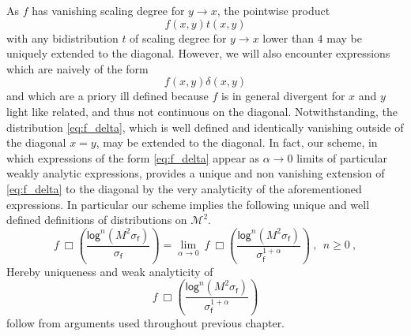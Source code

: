 \documentclass[11pt]{book}
\renewcommand{\log}{\mathsf{log}}
\newcommand{\Mcal}{\mathcal{M}}
\newcommand{\fsf}{\mathsf{f}}
\theoremstyle{break}
\begin{document}
As $f$ has vanishing scaling degree for $y \to x$, the pointwise product 
%
\begin{equation*}
f(x,y) t(x,y) 
\end{equation*}
%
with any bidistribution $t$ of scaling degree for $y\to x$ lower than $4$ may be uniquely extended to the diagonal. However, we will also encounter expressions which are naively of the form 
%
\begin{equation}
f(x,y) \delta(x,y) 
\label{eq:f_delta}
\end{equation}
%
and which are a priory ill defined because $f$ is in general divergent for $x$ and $y$ light like related, and thus not continuous on the diagonal. Notwithstanding, the distribution \eqref{eq:f_delta}, which is well defined and identically vanishing outside of the diagonal $x=y$, may be extended to the diagonal. In fact, our scheme, in which expressions of the form \eqref{eq:f_delta} appear as $\alpha \to 0$ limits of particular weakly analytic expressions, provides a unique and non vanishing extension of \eqref{eq:f_delta} to the diagonal by the very analyticity of the aforementioned expressions. In particular our scheme implies the following unique and well defined definitions of distributions on $\Mcal^2$.
%
\begin{equation}
f \ \Box \left( \frac{\log^n (M^2 \sigma_\fsf) }{\sigma_\fsf} \right) = \lim_{\alpha \to 0} \ f \ \Box \left(\frac{\log^n(M^2 \sigma_\fsf)}{\sigma^{1+\alpha}_\fsf} \right) \ , \ \ n \geq 0 \ ,
\label{eq:f_dists}
\end{equation}
%
Hereby uniqueness and weak analyticity of 
%
\begin{equation*}
f \ \Box\left( \frac{ \log^n(M^2 \sigma_\fsf) }{ \sigma^{1+\alpha}_\fsf } \right) 
\end{equation*}
%
follow from arguments used throughout previous chapter.


\bigskip
\end{document}
